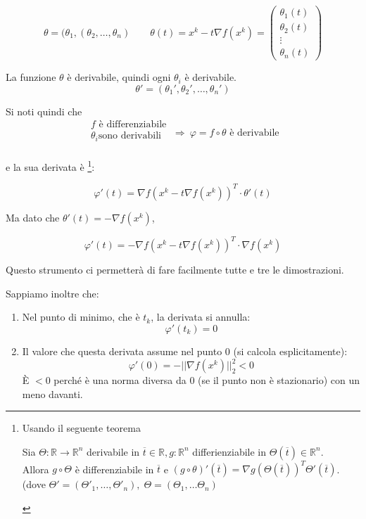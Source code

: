 $$ \theta = (\theta_{1},(\theta_{2}, \ldots, \theta_{n}) \qquad \theta(t) = x^{k}-t\nabla f(x^{k}) =  \left(\begin{matrix}\theta_{1}(t) \\\theta_{2}(t) \\ \vdots \\ \theta_{n}(t)\end{matrix}\right)$$

La funzione $\theta$ \`e derivabile, quindi ogni $\theta_i$ \`e
derivabile.
$$ \theta' = (\theta_1', \theta_2', \ldots, \theta_{n}' )$$

Si noti quindi che
$$
\left.\begin{matrix} f \text{ \`e differenziabile}\\ \theta_i \text{
sono derivabili} \\
\end{matrix}\right. ~ \Longrightarrow ~ \varphi = f \circ \theta
\text{ \`e derivabile}
$$

e la sua derivata \`e \footnote{ Usando il seguente teorema
  \begin{theo}
    \label{theo:derivata-funzioni-composte} Sia $\Theta:\mathbb{R}
\rightarrow \mathbb{R}^{n}$ derivabile in $\overline{t}\in \mathbb{R},
g: \mathbb{R}^{n}$ differienziabile in $\Theta(\overline{t})\in
\mathbb{R}^{n}$. \\ Allora $ g \circ \Theta$ \`e differenziabile in
$\overline{t}$ e $(g \circ \theta)'(\overline{t}) = \nabla
g(\Theta(\overline{t}))^{T} \Theta'(\overline{t})$.  (dove $\Theta' =
(\Theta'_1, \ldots , \Theta'_n), \; \Theta = (\Theta_1, \ldots
\Theta_n)$
  \end{theo}}:

$$ \varphi'(t) = \nabla f(x^{k} - t \nabla f(x^k))^T \cdot \theta'(t)$$

Ma dato che $ \theta'(t) = - \nabla f(x^k)$,

\begin{equation}
\label{eq:derivata-phi} \varphi'(t) = -\nabla f(x^{k} - t \nabla
f(x^{k}))^{T} \cdot \nabla f(x^{k})
\end{equation}

Questo strumento ci permetter\`a di fare facilmente tutte e tre le
dimostrazioni.

Sappiamo inoltre che:
\begin{enumerate}
\item Nel punto di minimo, che \`e $t_k$, la derivata si annulla: $$
\varphi'(t_k) = 0$$
\item Il valore che questa derivata assume nel punto $0$ (si calcola
esplicitamente): $$\varphi'(0) = -||\nabla f(x^{k})||_{2}^{2} < 0$$ \`E
$<0$ perch\'e \`e una norma diversa da $0$ (se il punto non \`e stazionario)
con un meno davanti.
\end{enumerate}


